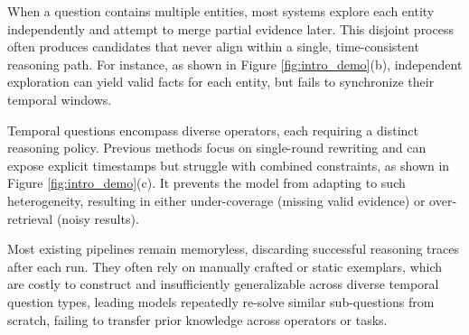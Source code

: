 When a question contains multiple entities, most systems \cite{T4,  tog1.0sun2023think,plan-on-graph} explore each entity independently and attempt to merge partial evidence later.  
This disjoint process often produces candidates that never align within a single, time-consistent reasoning path.  
For instance, as shown in Figure \ref{fig:intro_demo}(b), independent exploration can yield valid facts for each entity, but fails to synchronize their temporal windows.  

Temporal questions encompass diverse operators, each requiring a distinct reasoning policy.  
Previous methods \cite{saxena2021question,T4} focus on 
single-round rewriting and can expose explicit timestamps but struggle with combined constraints, as shown in Figure \ref{fig:intro_demo}(c).  
It prevents the model from adapting to such heterogeneity, resulting in either under-coverage (missing valid evidence) or over-retrieval (noisy results).  

Most existing pipelines \cite{qianyihu-etal-2025-time, T4, tog2.0ma2024think, pogtan2025paths} remain memoryless, discarding successful reasoning traces after each run.  
They often rely on manually crafted or static exemplars, which are costly to construct and insufficiently generalizable across diverse temporal question types, leading models repeatedly re-solve similar sub-questions from scratch, failing to transfer prior knowledge across operators or tasks.  




